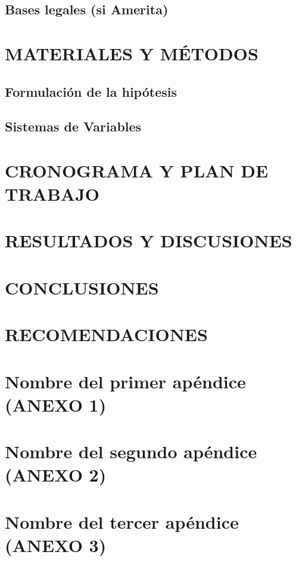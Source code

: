 \documentclass[11pt,oneside,a4paper]{book}
\begin{document}
\newpage
\section{Bases legales (si Amerita)}
\lipsum[1]

\chapter[CAPÍTULO III - MATERIALES Y MÉTODOS]{MATERIALES Y MÉTODOS}
\lipsum[4-10]

\newpage
\section{Formulación de la hipótesis}
\lipsum[1]

\newpage
\section{Sistemas de Variables}
\lipsum[1]

\protect
\chapter[CAPÍTULO IV - CRONOGRAMA Y PLAN DE TRABAJO]
{CRONOGRAMA Y PLAN DE TRABAJO}

\protect
\chapter[CAPÍTULO V - RESULTADOS Y DISCUSIONES]{RESULTADOS Y DISCUSIONES}

\lipsum[4-10]

\chapter[CAPÍTULO VI - CONCLUSIONES]{CONCLUSIONES}
\lipsum[4-10]


\chapter[CAPÍTULO VII - RECOMENDACIONES]{RECOMENDACIONES}
\lipsum[1]


\newpage
\begin{appendices}
\chapter{Nombre del primer apéndice (ANEXO 1)}

\chapter{Nombre del segundo apéndice (ANEXO 2)}

\chapter{Nombre del tercer apéndice (ANEXO 3)}

\end{appendices}


\newpage






\end{document}
